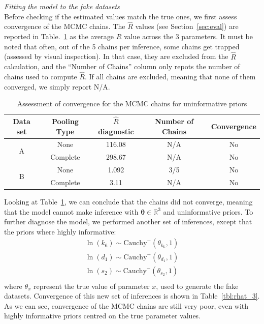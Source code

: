 \documentclass[11pt]{article}
\begin{document}
\textit{Fitting the model to the fake datasets}\\[5pt] 
Before checking if the estimated values match the true ones, we first assess convergence of the MCMC chains. The $\hat{R}$ values (see Section~\ref{sec:eval}) are reported in Table.~\ref{tbl:rhat_2} as the average $\hat{R}$ value across the 3 parameters. It must be noted that often, out of the 5 chains per inference, some chains  get trapped (assessed by visual inspection). In that case, they are excluded from the $\hat{R}$ calculation, and the ``Number of Chains'' column only repots the number of chains used to compute $\hat{R}$. If all chains are excluded, meaning that none of them converged, we simply report N/A.

\begin{table}[!h]
    \centering
    \caption{Assessment of convergence for the MCMC chains for uninformative priors}
    \begin{tabular}{c|c||c|c|c}
        \hline
        Data set & Pooling Type & $\hat{R}$ diagnostic & Number of Chains & Convergence  \\ \hline 
        \multirow{2}{*}{A}      & None     & 116.08 & N/A & No \\
                                & Complete & 298.67 & N/A & No \\ \hline 
        \multirow{2}{*}{B}      & None     & 1.092  & 3/5 & No \\
                                & Complete & 3.11   & N/A & No \\ \hline 
    \end{tabular}
    \label{tbl:rhat_2}
\end{table}
Looking at Table~\ref{tbl:rhat_2}, we can conclude that the chains did not converge, meaning that the model cannot make inference with $\boldsymbol{\theta} \in \mathbb{R}^3$ and uninformative priors. To further diagnose the model, we performed another set of inferences, except that the priors where highly informative:
\begin{align*}
    \ln(k_6) \sim \text{Cauchy}^-(\theta_{k_6}, 1) \\ 
    \ln(d_1) \sim \text{Cauchy}^+(\theta_{d_1}, 1) \\ 
    \ln(s_2) \sim \text{Cauchy}^-(\theta_{s_2}, 1) \\ 
\end{align*} 
where $\theta_x$ represent the true value of parameter $x$, used to generate the fake datasets. Convergence of this new set of inferences is shown in Table~\ref{tbl:rhat_3}. As we can see, convergence of the MCMC chains are still very poor, even with highly informative priors centred on the true parameter values.
\end{document}
